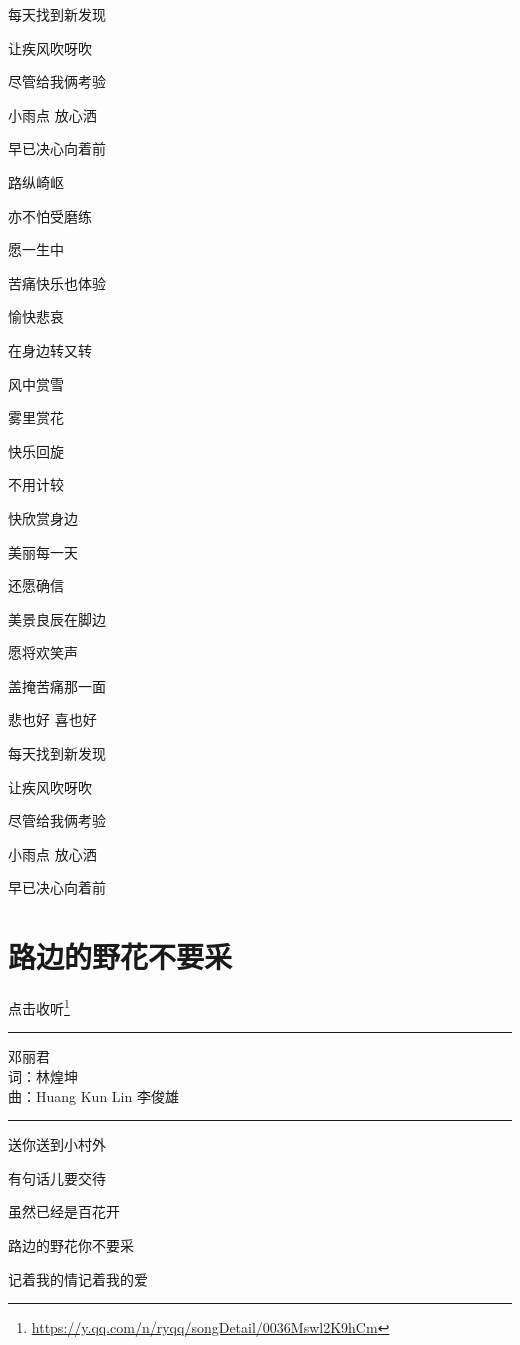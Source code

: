 \documentclass[]{ctexbook}
\renewcommand{\href}[2]{#2\footnote{\url{#1}}}
\begin{document}
每天找到新发现

让疾风吹呀吹

尽管给我俩考验

小雨点 放心洒

早已决心向着前

路纵崎岖

亦不怕受磨练

愿一生中

苦痛快乐也体验

愉快悲哀

在身边转又转

风中赏雪

雾里赏花

快乐回旋

不用计较

快欣赏身边

美丽每一天

还愿确信

美景良辰在脚边

愿将欢笑声

盖掩苦痛那一面

悲也好 喜也好

每天找到新发现

让疾风吹呀吹

尽管给我俩考验

小雨点 放心洒

早已决心向着前

\section*{路边的野花不要采}\label{only-with-me}


\href{https://y.qq.com/n/ryqq/songDetail/0036Mswl2K9hCm}{点击收听}

\begin{center}\rule{0.5\linewidth}{0.5pt}\end{center}

邓丽君\\
词：林煌坤\\
曲：Huang Kun Lin 李俊雄

\begin{center}\rule{0.5\linewidth}{0.5pt}\end{center}

送你送到小村外

有句话儿要交待

虽然已经是百花开

路边的野花你不要采

记着我的情记着我的爱
\end{document}
